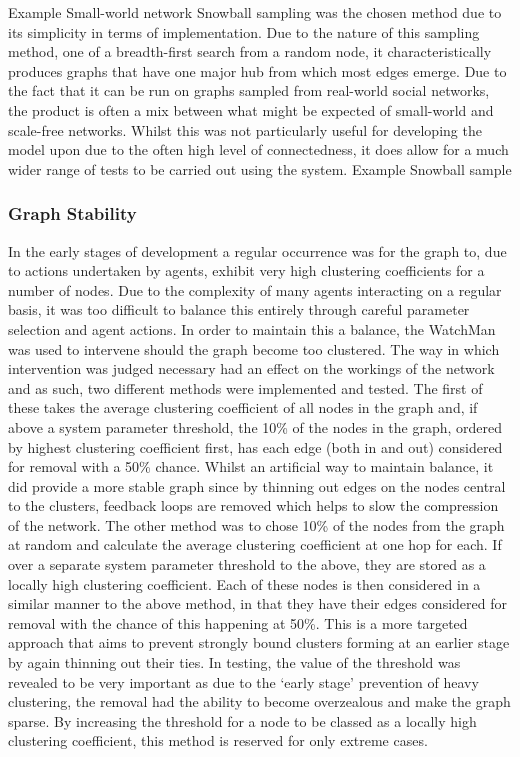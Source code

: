 \documentclass[]{report}
\begin{document}
Example Small-world network
Snowball sampling was the chosen method due to its simplicity in terms of implementation. Due to the nature of this sampling method, one of a breadth-first search from a random node, it characteristically produces graphs that have one major hub from which most edges emerge. Due to the fact that it can be run on graphs sampled from real-world social networks, the product is often a mix between what might be expected of small-world and scale-free networks. Whilst this was not particularly useful for developing the model upon due to the often high level of connectedness, it does allow for a much wider range of tests to be carried out using the system.
Example Snowball sample

\subsubsection{Graph Stability}
In the early stages of development a regular occurrence was for the graph to, due to actions undertaken by agents, exhibit very high clustering coefficients for a number of nodes. Due to the complexity of many agents interacting on a regular basis, it was too difficult to balance this entirely through careful parameter selection and agent actions. In order to maintain this a balance, the WatchMan was used to intervene should the graph become too clustered.
The way in which intervention was judged necessary had an effect on the workings of the network and as such, two different methods were implemented and tested. The first of these takes the average clustering coefficient of all nodes in the graph and, if above a system parameter threshold, the 10\% of the nodes in the graph, ordered by highest clustering coefficient first, has each edge (both in and out) considered for removal with a 50\% chance. Whilst an artificial way to maintain balance, it did provide a more stable graph since by thinning out edges on the nodes central to the clusters, feedback loops are removed which helps to slow the compression of the network.
The other method was to chose 10\% of the nodes from the graph at random and calculate the average clustering coefficient at one hop for each. If over a separate system parameter threshold to the above, they are stored as a locally high clustering coefficient. Each of these nodes is then considered in a similar manner to the above method, in that they have their edges considered for removal with the chance of this happening at 50\%. This is a more targeted approach that aims to prevent strongly bound clusters forming at an earlier stage by again thinning out their ties. In testing, the value of the threshold was revealed to be very important as due to the `early stage' prevention of heavy clustering, the removal had the ability to become overzealous and make the graph sparse. By increasing the threshold for a node to be classed as a locally high clustering coefficient, this method is reserved for only extreme cases.
\end{document}
